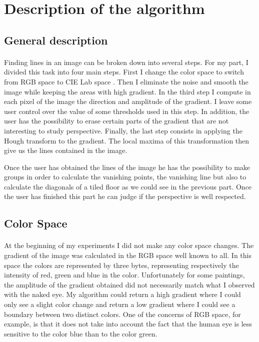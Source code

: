 \documentclass[11pt]{article}
\begin{document}
	\section{Description of the algorithm}
	

	\subsection{General description}
	\label{s:general}
	
	\paragraph{}
	Finding lines in an image can be broken down into several steps. For my part, I divided this task into four main steps. First I change the color space to switch from RGB space to CIE Lab space \cite{cielab}. Then I eliminate the noise and smooth the image while keeping the areas with high gradient. In the third step I compute in each pixel of the image the direction and amplitude of the gradient. I leave some user control over the value of some thresholds used in this step. In addition, the user has the possibility to erase certain parts of the gradient that are not interesting to study perspective. Finally, the last step consists in applying the Hough transform to the gradient. The local maxima of this transformation then give us the lines contained in the image.
	
	Once the user has obtained the lines of the image he has the possibility to make groups in order to calculate the vanishing points, the vanishing line but also to calculate the diagonals of a tiled floor as we could see in the previous part. Once the user has finished this part he can judge if the perspective is well respected.
	
	\subsection{Color Space}
	
	\paragraph{}
	At the beginning of my experiments I did not make any color space changes. The gradient of the image was calculated in the RGB space well known to all. In this space the colors are represented by three bytes, representing respectively the intensity of red, green and blue in the color. Unfortunately for some paintings, the amplitude of the gradient obtained did not necessarily match what I observed with the naked eye. My algorithm could return a high gradient where I could only see a slight color change and return a low gradient where I could see a boundary between two distinct colors. One of the concerns of RGB space, for example, is that it does not take into account the fact that the human eye is less sensitive to the color blue than to the color green.
	
\end{document}
